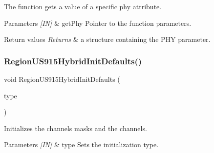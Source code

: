 The function gets a value of a specific phy attribute. 


\begin{DoxyParams}{Parameters}
{\em \mbox{[}\+I\+N\mbox{]}} & get\+Phy Pointer to the function parameters.\\
\hline
\end{DoxyParams}

\begin{DoxyRetVals}{Return values}
{\em Returns} & a structure containing the P\+HY parameter. \\
\hline
\end{DoxyRetVals}
\mbox{\label{group__REGIONUS915HYB_ga05e578b7048a754fbd73b71d3a938a7f}} 
\subsubsection{\texorpdfstring{Region\+U\+S915\+Hybrid\+Init\+Defaults()}{RegionUS915HybridInitDefaults()}}
{\footnotesize\ttfamily void Region\+U\+S915\+Hybrid\+Init\+Defaults (\begin{DoxyParamCaption}\item[{\hyperlink{group__REGION_gaddc73ae10673ec925724e7870363bda9}{Init\+Type\+\_\+t}}]{type }\end{DoxyParamCaption})}



Initializes the channels masks and the channels. 


\begin{DoxyParams}{Parameters}
{\em \mbox{[}\+I\+N\mbox{]}} & type Sets the initialization type. \\
\hline
\end{DoxyParams}
\mbox{\label{group__REGIONUS915HYB_gade4dc50b11235e0a6675b0d22240dea2}} 
